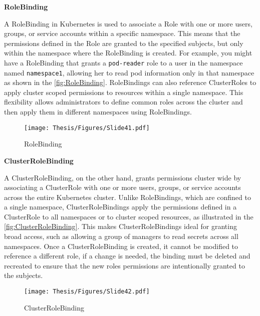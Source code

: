\textbf{RoleBinding}

A RoleBinding in Kubernetes is used to associate a Role with one or more users, groups, or service accounts within a specific namespace. This means that the permissions defined in the Role are granted to the specified subjects, but only within the namespace where the RoleBinding is created. For example, you might have a RoleBinding that grants a \texttt{pod-reader} role to a user in the namespace named \texttt{namespace1}, allowing her to read pod information only in that namespace as shown in the \autoref{fig:RoleBinding}. RoleBindings can also reference ClusterRoles to apply cluster scoped permissions to resources within a single namespace. This flexibility allows administrators to define common roles across the cluster and then apply them in different namespaces using RoleBindings. \cite{Kubernetes_doc}



\captionsetup{justification=centering}
\begin{figure}[h]
\centering
\texttt{[image: Thesis/Figures/Slide41.pdf]}
\caption{\label{fig:RoleBinding}RoleBinding \cite{rahasak_Kubernetes_rbac}}
\end{figure}

\clearpage

\textbf{ClusterRoleBinding}

A ClusterRoleBinding, on the other hand, grants permissions cluster wide by associating a ClusterRole with one or more users, groups, or service accounts across the entire Kubernetes cluster. Unlike RoleBindings, which are confined to a single namespace, ClusterRoleBindings apply the permissions defined in a ClusterRole to all namespaces or to cluster scoped resources, as illustrated in the \autoref{fig:ClusterRoleBinding}. This makes ClusterRoleBindings ideal for granting broad access, such as allowing a group of managers to read secrets across all namespaces. Once a ClusterRoleBinding is created, it cannot be modified to reference a different role, if a change is needed, the binding must be deleted and recreated to ensure that the new roles permissions are intentionally granted to the subjects. \cite{Kubernetes_doc}


\captionsetup{justification=centering}
\begin{figure}[h]
\centering
\texttt{[image: Thesis/Figures/Slide42.pdf]}
\caption{\label{fig:ClusterRoleBinding}ClusterRoleBinding \cite{rahasak_Kubernetes_rbac}}
\end{figure}

